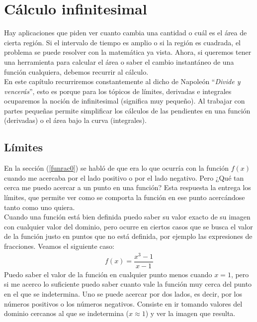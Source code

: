 \chapter{Cálculo infinitesimal}
\label{C1V}

Hay aplicaciones que piden ver cuanto cambia una cantidad o cuál es el área de cierta región. Si el intervalo de tiempo es amplio o si la región es cuadrada, el problema se puede resolver con la matemática ya vista. Ahora, si queremos tener una herramienta para calcular el área o saber el cambio instantáneo de una función cualquiera, debemos recurrir al cálculo. \\

En este capítulo recurriremos constantemente al dicho de Napoleón ``\textit{Divide y vencerás}'', esto es porque para los tópicos de límites, derivadas e integrales ocuparemos la noción de infinitesimal (significa muy pequeño). Al trabajar con partes pequeñas permite simplificar los cálculos de las pendientes en una función (derivadas) o el área bajo la curva (integrales).  

\section{Límites}
\label{C1V0}

En la sección (\ref{funrac0}) se habló de que era lo que ocurría con la función $f(x)$ cuando me acercaba por el lado positivo o por el lado negativo. Pero ¿Qué tan cerca me puedo acercar a un punto en una función? Esta respuesta la entrega los límites, que permite ver como se comporta la función en ese punto acercándose tanto como uno quiera.\\

Cuando una función está bien definida puedo saber su valor exacto de su imagen con cualquier valor del dominio, pero ocurre en ciertos casos que se busca el valor de la función justo en puntos que no está definida, por ejemplo las expresiones de fracciones. Veamos el siguiente caso:
\begin{eqnarray}
f(x)=\dfrac{x^{3}-1}{x-1}
\end{eqnarray} 
Puedo saber el valor de la función en cualquier punto menos cuando $x=1$, pero si me acerco lo suficiente puedo saber cuanto vale la función muy cerca del punto en el que se indetermina. Uno se puede acercar por dos lados, es decir, por los números positivos o los números negativos. Consiste en ir tomando valores del dominio cercanos al que se indetermina ($x\approx 1$) y ver la imagen que resulta.

